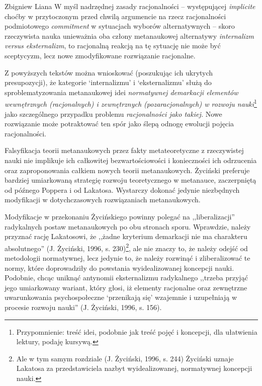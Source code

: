 \begin{artplenv}{Zbigniew Liana}
W myśl nadrzędnej zasady racjonalności -- występującej \textit{implicite} choćby w przytoczonym przed chwilą argumencie na
rzecz racjonalności podmiotowego \textit{commitment} w sytuacjach wyborów alternatywnych -- skoro rzeczywista nauka
unieważnia oba człony metanaukowej alternatywy \textit{internalizm versus eksternalizm}, to racjonalną reakcją na tę
sytuację nie może być sceptycyzm, lecz nowe zmodyfikowane rozwiązanie racjonalne.

Z powyższych tekstów można wnioskować (poszukując ich ukrytych presupozycji), że kategorie
`internalizmu' i `eksternalizmu' służą do sproblematyzowania metanaukowej idei \textit{normatywnej demarkacji
elementów wewnętrznych
(racjonalnych) i zewnętrznych (pozaracjonalnych) w rozwoju nauki}\footnote{Przypomnienie: treść idei, podobnie jak
treść pojęć i koncepcji, dla ułatwienia lektury, podaję kursywą.} jako szczególnego przypadku problemu
\textit{racjonalności jako takiej. }Nowe rozwiązanie może potraktować ten spór jako ślepą odnogę ewolucji pojęcia
racjonalności.

Falsyfikacja teorii metanaukowych przez fakty metateoretyczne z rzeczywistej nauki nie implikuje ich całkowitej
bezwartościowości i konieczności ich odrzucenia oraz zaproponowania całkiem nowych teorii metanaukowych. Życiński
preferuje bardziej umiarkowaną strategię rozwoju teoretycznego w metanauce, zaczerpniętą od późnego Poppera i od
Lakatosa. Wystarczy dokonać jedynie niezbędnych modyfikacji w dotychczasowych rozwiązaniach metanaukowych. 

Modyfikacje w przekonaniu Życińskiego powinny polegać na ,,liberalizacji'' radykalnych postaw metanaukowych po obu
stronach sporu. Wprawdzie, należy przyznać rację Lakatosowi, że ,,żadne kryterium demarkacji nie ma charakteru
absolutnego'' \label{ref:RNDlahtfGg0vv}(J. Życiński, 1996, s. 230)\footnote{Ale w tym samym rozdziale
\label{ref:RNDU4zrzQHMRM}(J. Życiński, 1996, s. 244) Życiński uznaje Lakatosa za przedstawiciela nazbyt
wyidealizowanej, normatywnej koncepcji nauki.}, ale nie znaczy to, że należy odejść od metodologii normatywnej, lecz
jedynie to, że należy rozwinąć i zliberalizować te normy, które doprowadziły do powstania wyidealizowanej koncepcji
nauki. Podobnie, chcąc uniknąć antynomii eksternalizmu radykalnego ,,trzeba przyjąć jego umiarkowany wariant, który
głosi, iż elementy racjonalne oraz zewnętrzne uwarunkowania psychospołeczne `przenikają się'
wzajemnie i uzupełniają w procesie rozwoju nauki'' \label{ref:RND0qiCuFReRd}(J. Życiński, 1996, s. 156).


\end{artplenv}
